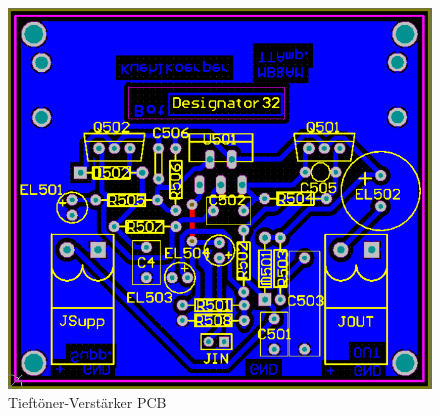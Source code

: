 \begin{figure} [H]
	\centering	
	\includegraphics[width=1\textwidth]{img/Print5/5_TTVerstaerker-PCB.PNG}
	\caption{Tieftöner-Verstärker PCB}
	\label {fig:4.4.4.1}
\end{figure}


